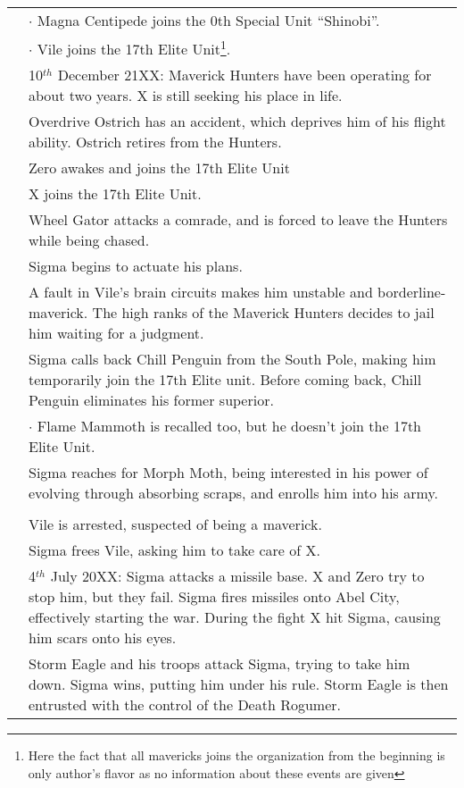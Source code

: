 \begin{tabularx}{\linewidth}{l X}
	\tabline& $\cdot$ Magna Centipede joins the 0th Special Unit ``Shinobi''.\\
	\tabline& $\cdot$ Vile joins the 17th Elite Unit\footnote{Here the fact that all mavericks joins the organization from the beginning is only author's flavor as no information about these events are given}.\\
	\midrule
	\tabdot& 10$^{th}$ December 21XX: Maverick Hunters have been operating for about two years. X is still seeking his place in life.\\
	\tabdot& Overdrive Ostrich has an accident, which deprives him of his flight ability. Ostrich retires from the Hunters.\\
	\tabdot& Zero awakes and joins the 17th Elite Unit\\
	\tabdot& X joins the 17th Elite Unit.\\
	\tabdot& Wheel Gator attacks a comrade, and is forced to leave the Hunters while being chased.\\
	\tabdot& Sigma begins to actuate his plans.\\
	\tabdot& A fault in Vile's brain circuits makes him unstable and borderline-maverick. The high ranks of the Maverick Hunters decides to jail him waiting for a judgment.\\
	\tabdot& Sigma calls back Chill Penguin from the South Pole, making him temporarily join the 17th Elite unit. Before coming back, Chill Penguin eliminates his former superior.\\
	\tabline& $\cdot$ Flame Mammoth is recalled too, but he doesn't join the 17th Elite Unit.\\
	\tabdot&Sigma reaches for Morph Moth, being interested in his power of evolving through absorbing scraps, and enrolls him into his army. \\
	\midrule
	\rowcolor{Aquamarine}
	\multicolumn{2}{c}{\textbf{Day of $\Sigma$ and beginning of the war}}\\
	\addlinespace[1.5ex]
	\tabdot& Vile is arrested, suspected of being a maverick.\\
	\tabdot& Sigma frees Vile, asking him to take care of X.\\
	\tabdot& 4$^{th}$ July 20XX: Sigma attacks a missile base. X and Zero try to stop him, but they fail. Sigma fires missiles onto Abel City, effectively starting the war. During the fight X hit Sigma, causing him scars onto his eyes.\\
	\tabdot& Storm Eagle and his troops attack Sigma, trying to take him down. Sigma wins, putting him under his rule. Storm Eagle is then entrusted with the control of the Death Rogumer.\\

\end{tabularx}

